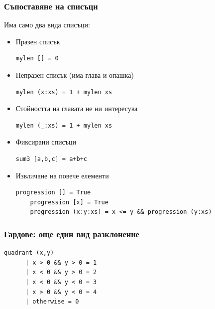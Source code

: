 \documentclass{beamer}
\begin{document}
\begin{frame}[fragile]
  \frametitle{Съпоставяне на списъци}

  Има само два вида списъци:
\begin{itemize}
  \item Празен списък
  \begin{lstlisting}[basicstyle=\small]
    mylen [] = 0
  \end{lstlisting}
  \item Непразен списък (има глава и опашка)
  \begin{lstlisting}[basicstyle=\small]
    mylen (x:xs) = 1 + mylen xs
  \end{lstlisting}
  \item Стойността на главата не ни интересува
  \begin{lstlisting}[basicstyle=\small]
    mylen (_:xs) = 1 + mylen xs
  \end{lstlisting}
  \item Фиксирани списъци
  \begin{lstlisting}[basicstyle=\small]
    sum3 [a,b,c] = a+b+c
  \end{lstlisting}
  \item Извличане на повече елементи
  \begin{lstlisting}[basicstyle=\small]
    progression [] = True
    progression [x] = True
    progression (x:y:xs) = x <= y && progression (y:xs)
  \end{lstlisting}
 
\end{itemize}

\end{frame}


\begin{frame}[fragile]
  \frametitle{Гардове: още един вид разклонение}

  \begin{lstlisting}[basicstyle=\small]
    quadrant (x,y) 
      | x > 0 && y > 0 = 1
      | x < 0 && y > 0 = 2
      | x < 0 && y < 0 = 3
      | x > 0 && y < 0 = 4
      | otherwise = 0
  \end{lstlisting}


\end{frame}
\end{document}
